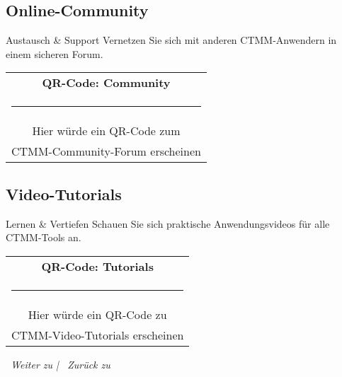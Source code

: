 \subsection*{\textcolor{ctmmPurple}{Online-Community}}

\begin{ctmmGreenBox}{Austausch \& Support}
Vernetzen Sie sich mit anderen CTMM-Anwendern in einem sicheren Forum.

\begin{center}
\begin{tabular}{c}
\textbf{QR-Code: Community}\\
\rule{3cm}{3cm}\\
\small{Hier würde ein QR-Code zum}\\
\small{CTMM-Community-Forum erscheinen}
\end{tabular}
\end{center}
\end{ctmmGreenBox}

\subsection*{\textcolor{ctmmPurple}{Video-Tutorials}}

\begin{ctmmOrangeBox}{Lernen \& Vertiefen}
Schauen Sie sich praktische Anwendungsvideos für alle CTMM-Tools an.

\begin{center}
\begin{tabular}{c}
\textbf{QR-Code: Tutorials}\\
\rule{3cm}{3cm}\\
\small{Hier würde ein QR-Code zu}\\
\small{CTMM-Video-Tutorials erscheinen}
\end{tabular}
\end{center}
\end{ctmmOrangeBox}

\vspace{1cm}
\begin{center}
\textit{\textcolor{ctmmPurple}{\faChevronRight~Weiter zu}  | \textcolor{ctmmGreen}{\faHome~Zurück zu} }
\end{center}
